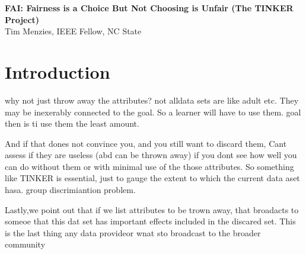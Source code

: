 \documentclass{NSF}
\newcommand{\TITLE}{FAI:  Fairness is a Choice But Not
Choosing is Unfair (The TINKER Project)}
\begin{document}
\begin{nsfdescription}
\thispagestyle{plain}
 \begin{center}
{\bf \TITLE}\\\vspace{1mm}
{Tim Menzies,  IEEE Fellow,  NC State}
 \end{center}


 



 \section{Introduction}\label{tion:intro}
 why not just throw away the attributes? not alldata sets are like adult etc. They may be inexerably
 connected to the goal. So a learner will have to use them. goal then is ti use them the least amount.
 
And if that dones not convince you, and you still want to discard them, Cant assess if they are useless (abd can be thrown away) if you dont see how well you can do without them or with minimal use of the those attributes. So something like TINKER is essential, just to gauge the extent to which the current data aset hasa. group discrimiantion problem.

Lastly,we point out that if we list attributes to be trown away, that broadacts to someoe that this dat set has important effects included in the 
discared set. This is the last thing any data provideor wnat sto broadcast to the broader community



\end{nsfdescription}
\end{document}
